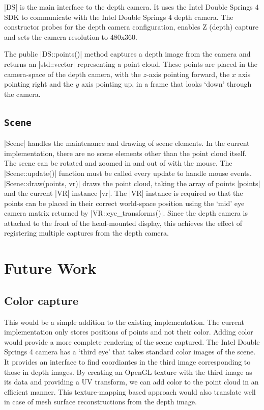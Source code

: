 \documentclass[pageno]{jpaper}
\begin{document}
|DS| is the main interface to the depth camera. It uses the Intel Double Springs
4 SDK to communicate with the Intel Double Springs 4 depth camera. The
constructor probes for the depth camera configuration, enables Z (depth) capture
and sets the camera resolution to 480x360.

The public |DS::points()| method captures a depth image from the camera and
returns an |std::vector| representing a point cloud. These points are placed in
the camera-space of the depth camera, with the $z$-axis pointing forward, the
$x$ axis pointing right and the $y$ axis pointing up, in a frame that looks
`down' through the camera.

\subsection{\lstinline|Scene|}

|Scene| handles the maintenance and drawing of scene elements. In the current
implementation, there are no scene elements other than the point cloud
itself. The scene can be rotated and zoomed in and out of with the mouse. The
|Scene::update()| function must be called every update to handle mouse
events. |Scene::draw(points, vr)| draws the point cloud, taking the array of
points |points| and the current |VR| instance |vr|. The |VR| instance is
required so that the points can be placed in their correct world-space position
using the `mid' eye camera matrix returned by |VR::eye_transforms()|. Since the
depth camera is attached to the front of the head-mounted display, this achieves
the effect of registering multiple captures from the depth camera.

\section{Future Work}

\subsection{Color capture}

This would be a simple addition to the existing implementation. The current
implementation only stores positions of points and not their color. Adding color
would provide a more complete rendering of the scene captured. The Intel Double
Springs 4 camera has a `third eye' that takes standard color images of the
scene. It provides an interface to find coordiantes in the third image
corresponding to those in depth images. By creating an OpenGL texture with the
third image as its data and providing a UV transform, we can add color to the
point cloud in an efficient manner. This texture-mapping based approach would
also translate well in case of mesh surface reconstructions from the depth
image.
\end{document}
